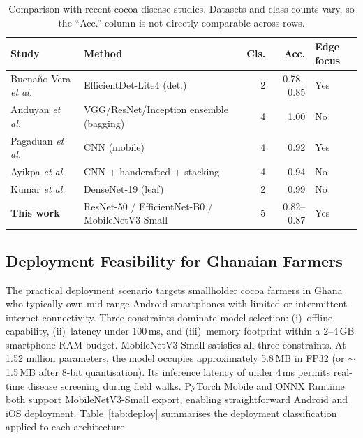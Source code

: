 \documentclass[conference,10pt]{IEEEtran}
\begin{document}
\begin{table}[t]
\centering
\caption{Comparison with recent cocoa-disease studies. Datasets and class
counts vary, so the ``Acc.'' column is not directly comparable across rows.}
\label{tab:comparison}
\renewcommand{\arraystretch}{1.15}
\begin{tabular}{p{}p{}rrp{}}
\toprule
\textbf{Study} & \textbf{Method} & \textbf{Cls.} & \textbf{Acc.} & \textbf{Edge focus} \\
\midrule
Buena\~no Vera \emph{et al.}~\cite{buenano2024} & EfficientDet-Lite4 (det.) & 2 & 0.78--0.85 & Yes \\
Anduyan \emph{et al.}~\cite{anduyan2025}        & VGG/ResNet/Inception ensemble (bagging) & 4 & 1.00 & No \\
Pagaduan \emph{et al.}~\cite{pagaduan2026}      & CNN (mobile)              & 4 & 0.92 & Yes \\
Ayikpa \emph{et al.}~\cite{ayikpa2025}          & CNN + handcrafted + stacking & 4 & 0.94 & No \\
Kumar \emph{et al.}~\cite{kumar2023}            & DenseNet-19 (leaf)        & 2 & 0.99 & No \\
\textbf{This work}                              & ResNet-50 / EfficientNet-B0 / MobileNetV3-Small & 5 & 0.82--0.87 & Yes \\
\bottomrule
\end{tabular}
\end{table}

\subsection{Deployment Feasibility for Ghanaian Farmers}

The practical deployment scenario targets smallholder cocoa farmers in Ghana
who typically own mid-range Android smartphones with limited or intermittent
internet connectivity. Three constraints dominate model selection:
(i)~offline capability, (ii)~latency under 100\,ms, and
(iii)~memory footprint within a 2--4\,GB smartphone RAM budget.
MobileNetV3-Small satisfies all three constraints. At 1.52 million parameters,
the model occupies approximately 5.8\,MB in FP32 (or $\sim$1.5\,MB after 8-bit
quantisation). Its inference latency of under 4\,ms permits real-time disease
screening during field walks. PyTorch Mobile and ONNX Runtime both support
MobileNetV3-Small export, enabling straightforward Android and iOS
deployment. Table~\ref{tab:deploy} summarises the deployment classification
applied to each architecture.
\end{document}
